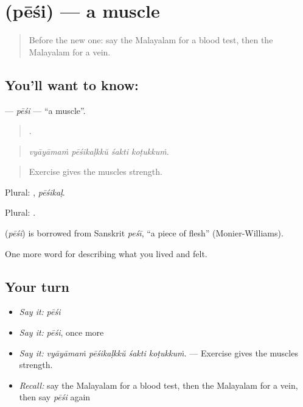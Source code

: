 \section[\texorpdfstring{\ml{പേശി} (pēśi)}{പേശി (pēśi)}]{ (pēśi) — a muscle}

\label{lesson:ML-C536-pesi}



\begin{quote}
Before the new one: say the Malayalam for a blood test, then the Malayalam for a vein.
\end{quote}

\subsection*{You'll want to know: }
\textbf{} — \emph{pēśi} — \textquotedblleft{}a muscle\textquotedblright{}.

\begin{quote}
   .
\end{quote}

\begin{quote}
\emph{vyāyāmaṁ pēśikaḷkkŭ śakti koṭukkuṁ.}
\end{quote}

\begin{quote}
Exercise gives the muscles strength.
\end{quote}

Plural: , \emph{pēśikaḷ}.

Plural: .

\begin{cousinweb}
\textbf{} (\emph{pēśi}) is borrowed from Sanskrit \emph{peśī}, \textquotedblleft{}a piece of flesh\textquotedblright{} (Monier-Williams).
\end{cousinweb}

\begin{grammarlens}[title={What you've built}]
One more word for describing what you lived and felt.
\end{grammarlens}

\subsection*{Your turn}
\begin{itemize}
\raggedright
  \item \emph{Say it:} \emph{pēśi}
  \item \emph{Say it:} \emph{pēśi}, once more
  \item \emph{Say it:} \emph{vyāyāmaṁ pēśikaḷkkŭ śakti koṭukkuṁ.} — Exercise gives the muscles strength.
  \item \emph{Recall:} say the Malayalam for a blood test, then the Malayalam for a vein, then say \emph{pēśi} again
\end{itemize}

